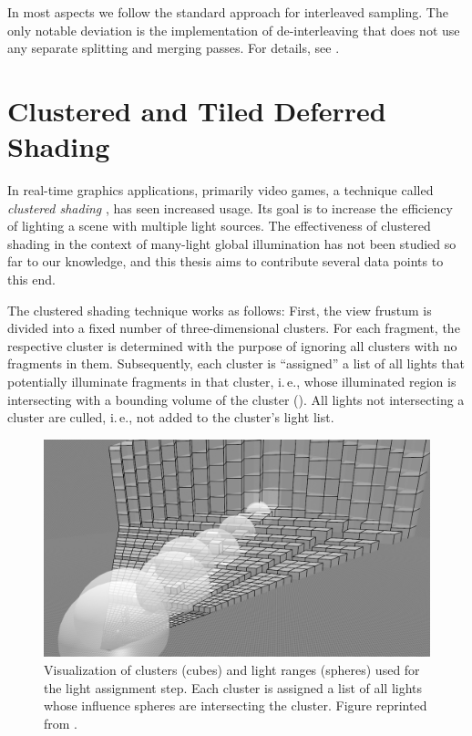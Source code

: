                  In most aspects we follow the standard approach for interleaved sampling. The only notable deviation is the implementation of de-interleaving that does not use any separate splitting and merging passes. For details, see .



\section{Clustered and Tiled Deferred Shading}
\label{sec:concept:clusteredShading}

In real-time graphics applications, primarily video games, a technique called \textit{clustered shading} \citep{olsson2012clustered}, has seen increased usage. Its goal is to increase the efficiency of lighting a scene with multiple light sources.
The effectiveness of clustered shading in the context of many-light global illumination has not been studied so far to our knowledge, and this thesis aims to contribute several data points to this end.

The clustered shading technique works as follows: First, the view frustum is divided into a fixed number of three-dimensional clusters. For each fragment, the respective cluster is determined with the purpose of ignoring all clusters with no fragments in them. Subsequently, each cluster is ``assigned'' a list of all lights that potentially illuminate fragments in that cluster, i.\,e., whose illuminated region is intersecting with a bounding volume of the cluster (). All lights not intersecting a cluster are culled, i.\,e., not added to the cluster's light list.

\begin{figure}[htb]
\centering
    \includegraphics[width=\textwidth]{graphics/clustered_olsson}
  \caption{Visualization of clusters (cubes) and light ranges (spheres) used for the light assignment step. Each cluster is assigned a list of all lights whose influence spheres are intersecting the cluster. Figure reprinted from \citet{Olsson:2015:manylightmanagement}.}
  \label{fig:concept:clustered_olsson}
\end{figure}


